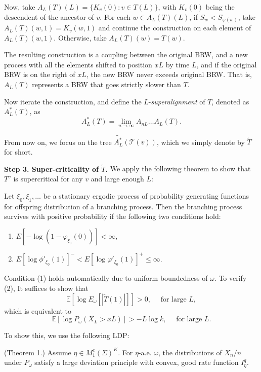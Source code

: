 Now, take $A_L(T)(L) = \{ K_v(0): v \in T(L)\} $, with $K_v(0)$ being the descendent of the ancestor of $v$. For each $w \in A_L(T)(L)$, if $S_w < S_{\varphi(w)}$, take $A_L(T)(w, 1) = K_v(w, 1)$ and continue the construction on each element of $A_L(T)(w, 1)$. Otherwise, take $A_L(T)(w) = T(w)$.

The resulting construction is a coupling between the original BRW, and a new process with all the elements shifted to position  $xL$ by time $L$, and if the original BRW is on the right of $xL$, the new BRW never exceeds original BRW. That is, $A_L(T)$ represents a BRW that goes strictly slower than $T$.

Now iterate the construction, and define the $L$-\textit{superalignment} of $T$, denoted as $A^*_L(T)$, as
\[
	A^*_L(T) = \lim_{n \to \infty } A_{n L} \ldots A_{L} (T)
.\] 

From now on, we focus on the tree $\widetilde{A^*_L}(\mathcal{T}(v))$, which we simply denote by $\tilde T$ for short.

\textbf{Step 3. Super-criticality of $\tilde T$.} We apply the following theorem to show that $T^v$ is supercritical for any $v$ and large enough $L$:

\begin{theorem}
	\label{thm:AthreyaKarlthm}
	Let $\xi_0, \xi_1, \ldots$ be a stationary ergodic process of probability generating functions for offspring distribution of a branching process. Then the branching process survives with positive probability if the following two conditions hold:
	\begin{enumerate}
		\item $E \left[ - \log \left( 1 - \varphi_{\xi_0}(0) \right)  \right] < \infty $,
		\item $E \left[ \log \phi'_{\xi_0}(1) \right] ^- < E \left[ \log \varphi'_{\xi_0}(1) \right] ^+ \le \infty $.
	\end{enumerate}
\end{theorem}

Condition (1) holds automatically due to uniform boundedness of $\omega$. To verify (2),
It suffices to show that
\[
	\mathbb{E}\left[ \log E_\omega\left[ |\tilde T(1)| \right]  \right] > 0, \quad \text{ for large }L
,\] 
which is equivalent to
\[
	\mathbb{E}\left[ \log P_\omega(X_L > xL) \right] > - L \log k, \quad \text{ for large }L
.\] 

To show this, we use the following LDP:
\begin{theorem}
	\label{thm:PositionLDPERWREComets}
	(Theorem 1.) Assume $\eta \in M_1^e(\Sigma)^K$. For $\eta$-a.e. $\omega$, the distributions of $X_n / n$ under $P_\omega$ satisfy a large deviation principle with convex, good rate function $I_\eta^q$.
\end{theorem}

